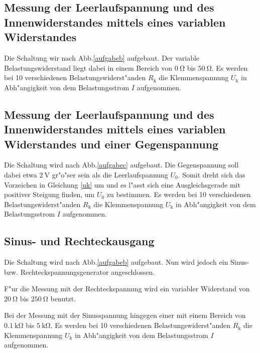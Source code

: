 \subsection{Messung der Leerlaufspannung und des Innenwiderstandes mittels eines variablen Widerstandes} %
\label{sub:messung_der_leerlaufspannung_mittels_eines_variablen_widerstandes_}

Die Schaltung wir nach Abb.\ref{aufgabeb} aufgebaut.
Der variable Belastungswiderstand liegt dabei in einem Bereich von $\SI{0}{\ohm}$ bis $\SI{50}{\ohm}$. Es werden bei 10 verschiedenen Belastungswiderst"anden $R_\mathrm{k}$ die Klemmenspannung $U_\mathrm{k}$ in Abh"angigkeit von dem Belastungsstrom $I$ aufgenommen.

\subsection{Messung der Leerlaufspannung und des Innenwiderstandes mittels eines variablen Widerstandes und einer Gegenspannung} %
\label{sub:messung_der_leerlaufspannung_mittels_eines_variablen_widerstandes_}

Die Schaltung wird nach Abb.\ref{aufgabec} aufgebaut.
Die Gegenspannung soll dabei etwa $\SI{2}{\volt}$ gr"o"ser sein als die Leerlaufspannung $U_\mathrm{0}$.
Somit dreht sich das Vorzeichen in Gleichung \eqref{uk} um und es l"asst sich eine Ausgleichsgerade mit positiver Steigung finden, um $U_0$ zu bestimmen.
Es werden bei 10 verschiedenen Belastungswiderst"anden $R_\mathrm{k}$ die Klemmenspannung $U_\mathrm{k}$ in Abh"angigkeit von dem Belastungsstrom $I$ aufgenommen.

\subsection{Sinus- und Rechteckausgang} %
\label{sub:sinus_und_rechteckausgang}

Die Schaltung wird nach Abb.\ref{aufgabeb} aufgebaut.
Nun wird jedoch ein Sinus- bzw. Rechteckspannungsgenerator angeschlossen.

F"ur die Messung mit der Rechteckspannung wird ein variabler Widerstand von $\SI{20}{\ohm}$ bis $\SI{250}{\ohm}$ benutzt.

Bei der Messung mit der Sinusspannung hingegen einer mit einem Bereich von $\SI{0.1}{\kilo\ohm}$ bis $\SI{5}{\kilo\ohm}$.
Es werden bei 10 verschiedenen Belastungswiderst"anden $R_\mathrm{k}$ die Klemmenspannung $U_\mathrm{k}$ in Abh"angigkeit von dem Belastungsstrom $I$ aufgenommen.
